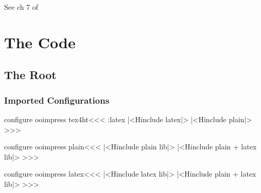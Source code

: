

\ifx \HTML\UnDef
   \def\HTML{ooimpress}%
   \def\PREAMBLE{%
      \usepackage{url}%
      \usepackage{hyperref}%
   }
   \def\OPTIONS{html,sections+,3}%
   \def\CONFIG{\jobname}
   \def\MAKETITLE{\author{Eitan M. Gurari, 
                          James Naughton, and Maarten Wisse}}         
   \def\next{  \endinput}
   \expandafter\next
\fi




See ch 7 of \cite{odbook}

\chapter{The Code}

\section{The Root}

\subsection{Imported Configurations}


\<configure ooimpress tex4ht\><<<
\if:latex  |<Hinclude latex|>
\else      |<Hinclude plain|>  \fi
>>>


\<configure ooimpress plain\><<<
|<Hinclude plain lib|>
|<Hinclude plain + latex lib|>
>>>

\<configure ooimpress latex\><<<
|<Hinclude latex lib|>
|<Hinclude plain + latex lib|>
>>>


